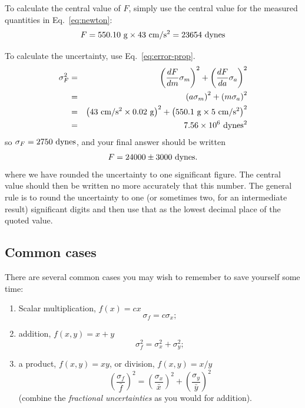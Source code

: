 To calculate the central value of $F$, simply use the central value for the
measured quantities in Eq.~\ref{eq:newton}: 
\begin{equation}
F = 550.10 ~{\rm g} \times 43~ {\rm cm}/{\rm s}^2 = 23654 ~{\rm dynes}
\end{equation}

To calculate the uncertainty, use Eq.~\ref{eq:error-prop}.
\begin{eqnarray*}
\sigma_F^2 &=& \left( {dF \over dm} \sigma_m \right)^2 + \left( {dF \over da} \sigma_a \right)^2 \\
&=& \left( a \sigma_m \right)^2 + \left( m \sigma_a \right)^2 \\
&=& \left( 43 ~{\rm cm}/{\rm s}^2\times  0.02 ~{\rm g} \right)^2 + \left( 550.1 ~{\rm g}\times  5~ {\rm cm}/{\rm s}^2\right)^2 \\
&=& 7.56\times 10^6 ~{\rm dynes^2}
\end{eqnarray*}
so $\sigma_F = 2750 ~{\rm dynes}$, and your final answer should be written
\begin{equation}
F = 24000 \pm 3000 ~{\rm dynes}.
\end{equation}
where we have rounded the uncertainty to one significant figure. The central value should then be written no more
accurately that this number.  The general rule is to round the uncertainty to one
(or sometimes two, for an intermediate result) significant digits and then use
that as the lowest decimal place of the quoted value.

\subsection{Common cases}
There are several common cases you may wish to remember to save yourself some time:
\begin{enumerate}
\item Scalar multiplication, $f(x) = cx$
\[
\sigma_f = c\sigma_x;
\]
\item addition, $f(x,y) = x + y$
\[
\sigma_f^2 = \sigma_x^2 + \sigma_y^2;
\]
\item a product, $f(x,y) = xy$, or division, $f(x,y) = x/y$
\[
\left( \frac{\sigma_f}{\bar{f}} \right)^2 = \left( \frac{\sigma_x}{\bar{x}} \right)^2 + \left( \frac{\sigma_y}{\bar{y}} \right)^2
\]
(combine the {\em fractional uncertainties} as you would for addition). 
\end{enumerate}


